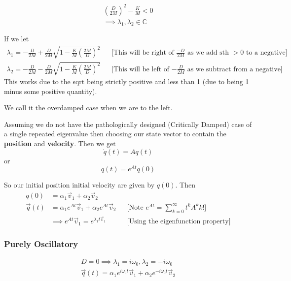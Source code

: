 \hrulefill

\begin{align*}
    \left(\frac{D}{2M}\right)^2 - \frac KM < 0 
    \\
    \implies \lambda_1, \lambda_2 \in\mathbb C
\end{align*}

\hrulefill

If we let 
\begin{align*}
    \lambda_1 = -\frac D{2M}+\frac D{2M}\sqrt{1 - \frac{K}{M}\left(\frac{2M}{D}\right)^2}
    &&\text{[This will be right of $\frac{-D}{2M}$ as we add sth $>0$ to a negative]}
    \\\lambda_2 = -\frac D{2M}-\frac D{2M}\sqrt{1 - \frac{K}{M}\left(\frac{2M}{D}\right)^2}
    &&\text{[This will be left of $-\frac{D}{2M}$ as we subtract from a negative]}
\end{align*}
This works due to the sqrt being strictly positive and less than 1 (due to being 1 minus some positive quantity).

We call it the overdamped case when we are to the left.

\hrulefill

Assuming we do not have the pathologically designed (Critically Damped) case of a single repeated eigenvalue then choosing our state vector to contain the \textbf{position} and \textbf{velocity}. Then we get
\[
    \dot q(t) = A q(t)
\]
or
\[
    q(t) = e^{At} q(0)
\]

So our initial position initial velocity are given by $q(0)$. Then 
\begin{align*}
    q(0) 
    &= 
    \alpha_1\vec v_1 + \alpha_2 \vec v_2
    \\
    \vec q(t) 
    &= 
    \alpha_1 e^{At} \vec v_1 + \alpha_2 e^{At} \vec v_2
    &&\text{[Note $e^{At}=\sum_{k=0}^\infty {t^kA^k}{k!}$]}
    \\
    &\implies e^{At}\vec v_1=e^{\lambda_1 t \vec v_1}
    &&\text{[Using the eigenfunction property]}
\end{align*}

\subsubsection{Purely Oscillatory}
\begin{align*}
    D=0\implies \lambda_1=i\omega_0, \lambda_2=-i\omega_0
    \\
    \vec q(t) = \alpha_1 e^{i\omega_0 t}\vec v_1+\alpha_2 e^{-i\omega_0 t}\vec v_2
\end{align*}

